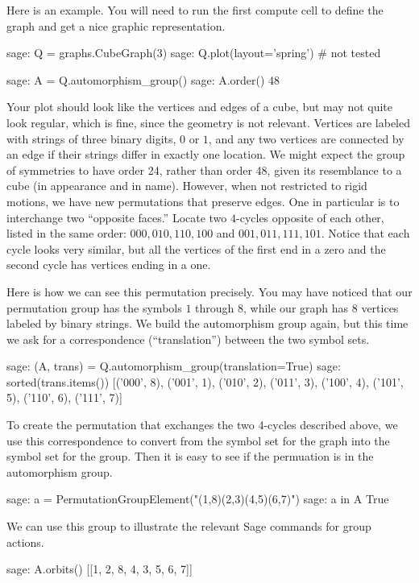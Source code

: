 %
Here is an example.  You will need to run the first compute cell to define the graph and get a nice graphic representation.
%
\begin{sageexample}
sage: Q = graphs.CubeGraph(3)
sage: Q.plot(layout='spring')      # not tested
\end{sageexample}
%
\begin{sageexample}
sage: A = Q.automorphism_group()
sage: A.order()
48
\end{sageexample}
%
Your plot should look like the vertices and edges of a cube, but may not quite look regular, which is fine, since the geometry is not relevant.  Vertices are labeled with strings of three binary digits, $0$ or $1$, and any two vertices are connected by an edge if their strings differ in exactly one location.  We might expect the group of symmetries to have order 24, rather than order 48, given its resemblance to a cube (in appearance and in name).  However, when not restricted to rigid motions, we have new permutations that preserve edges.  One in particular is to interchange two ``opposite faces.''  Locate two $4$-cycles opposite of each other, listed in the same order:  $000, 010, 110, 100$ and $001, 011, 111, 101$.  Notice that each cycle looks very similar, but all the vertices of the first end in a zero and the second cycle has vertices ending in a one.\par
%
Here is how we can see this permutation precisely.  You may have noticed that our permutation group has the symbols $1$ through $8$, while our graph has 8 vertices labeled by binary strings.  We build the automorphism group again, but this time we ask for a correspondence (``translation'') between the two symbol sets.
%
\begin{sageexample}
sage: (A, trans) = Q.automorphism_group(translation=True)
sage: sorted(trans.items())
[('000', 8), ('001', 1), ('010', 2), ('011', 3),
 ('100', 4), ('101', 5), ('110', 6), ('111', 7)]
\end{sageexample}
%
To create the permutation that exchanges the two 4-cycles described above, we use this correspondence to convert from the symbol set for the graph into the symbol set for the group.  Then it is easy to see if the permuation is in the automorphism group.
%
\begin{sageexample}
sage: a = PermutationGroupElement("(1,8)(2,3)(4,5)(6,7)")
sage: a in A
True
\end{sageexample}
%
We can use this group to illustrate the relevant Sage commands for group actions.
%
\begin{sageexample}
sage: A.orbits()
[[1, 2, 8, 4, 3, 5, 6, 7]]
\end{sageexample}
